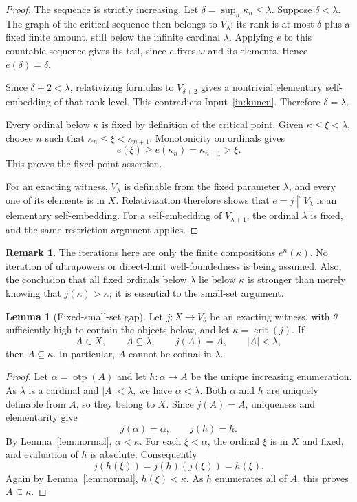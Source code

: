 \documentclass[11pt,letterpaper]{article}
\theoremstyle{definition}
\newtheorem{lemma}[definition]{Lemma}
\newtheorem{remark}[definition]{Remark}
\numberwithin{equation}{section}
\newcommand{\crit}{\operatorname{crit}}
\newcommand{\restr}{\mathbin{\upharpoonright}}
\newcommand{\otp}{\operatorname{otp}}
\begin{document}
\begin{proof}
The sequence is strictly increasing. Let $\delta=\sup_n\kappa_n\le\lambda$. Suppose $\delta<\lambda$. The graph of the critical sequence then belongs to $V_\lambda$: its rank is at most $\delta$ plus a fixed finite amount, still below the infinite cardinal $\lambda$. Applying $e$ to this countable sequence gives its tail, since $e$ fixes $\omega$ and its elements. Hence $e(\delta)=\delta$.

Since $\delta+2<\lambda$, relativizing formulas to $V_{\delta+2}$ gives a nontrivial elementary self-embedding of that rank level. This contradicts Input~\ref{in:kunen}. Therefore $\delta=\lambda$.

Every ordinal below $\kappa$ is fixed by definition of the critical point. Given $\kappa\le\xi<\lambda$, choose $n$ such that
$\kappa_n\le\xi<\kappa_{n+1}$. Monotonicity on ordinals gives
\[
 e(\xi)\ge e(\kappa_n)=\kappa_{n+1}>\xi.
\]
This proves the fixed-point assertion.

For an exacting witness, $V_\lambda$ is definable from the fixed parameter $\lambda$, and every one of its elements is in $X$. Relativization therefore shows that $e=j\restr V_\lambda$ is an elementary self-embedding. For a self-embedding of $V_{\lambda+1}$, the ordinal $\lambda$ is fixed, and the same restriction argument applies.
\end{proof}

\begin{remark}
The iterations here are only the finite compositions $e^n(\kappa)$. No iteration of ultrapowers or direct-limit well-foundedness is being assumed. Also, the conclusion that all fixed ordinals below $\lambda$ lie below $\kappa$ is stronger than merely knowing that $j(\kappa)>\kappa$; it is essential to the small-set argument.
\end{remark}

\begin{lemma}[Fixed-small-set gap]\label{lem:fixedsmall}
Let $j:X\to V_\theta$ be an exacting witness, with $\theta$ sufficiently high to contain the objects below, and let $\kappa=\crit(j)$. If
\[
 A\in X,\qquad A\subseteq\lambda,\qquad j(A)=A,
 \qquad |A|<\lambda,
\]
then $A\subseteq\kappa$. In particular, $A$ cannot be cofinal in $\lambda$.
\end{lemma}

\begin{proof}
Let $\alpha=\otp(A)$ and let $h:\alpha\to A$ be the unique increasing enumeration. As $\lambda$ is a cardinal and $|A|<\lambda$, we have $\alpha<\lambda$. Both $\alpha$ and $h$ are uniquely definable from $A$, so they belong to $X$. Since $j(A)=A$, uniqueness and elementarity give
\[
 j(\alpha)=\alpha,\qquad j(h)=h.
\]
By Lemma~\ref{lem:normal}, $\alpha<\kappa$. For each $\xi<\alpha$, the ordinal $\xi$ is in $X$ and fixed, and evaluation of $h$ is absolute. Consequently
\[
 j(h(\xi))=j(h)(j(\xi))=h(\xi).
\]
Again by Lemma~\ref{lem:normal}, $h(\xi)<\kappa$. As $h$ enumerates all of $A$, this proves $A\subseteq\kappa$.
\end{proof}
\end{document}
